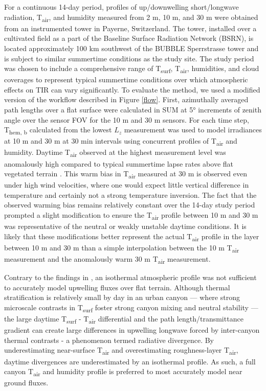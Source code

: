 \begin{bibunit}
For a continuous 14-day period, profiles of up/downwelling short/longwave radiation, T\textsubscript{air}, and humidity measured from 2 \si{m}, 10 \si{m}, and 30 \si{m} were obtained from an instrumented tower in Payerne, Switzerland. The tower, installed over a cultivated field as a part of the Baseline Surface Radiation Network (BSRN), is located approximately 100 \si{\kilo\meter} southwest of the BUBBLE Sperrstrasse tower and is subject to similar summertime conditions as the study site. The study period was chosen to include a comprehensive range of T\textsubscript{surf}, T\textsubscript{air}, humidities, and cloud coverages to represent typical summertime conditions over which atmospheric effects on TIR can vary significantly. To evaluate the method, we used a modified version of the workflow described in Figure \ref{flow}. First, azimuthally averaged path lengths over a flat surface were calculated in SUM at 5\si{\degree} increments of zenith angle over the sensor FOV for the 10 \si{\meter} and 30 \si{\meter} sensors. For each time step, T\textsubscript{hem, b} calculated from the lowest $L_z$ measurement was used to model irradiances at 10 \si{m} and 30 \si{m} at 30 \si{\minute} intervals using concurrent profiles of T\textsubscript{air} and humidity. Daytime T\textsubscript{air} observed at the highest measurement level was anomalously high compared to typical summertime lapse rates above flat vegetated terrain \citep{Oke1987}. This warm bias in T\textsubscript{air} measured at 30 \si{\meter} is observed even under high wind velocities, where one would expect little vertical difference in temperature and certainly not a strong temperature inversion. The fact that the observed warming bias remains relatively constant over the 14-day study period prompted a slight modification to ensure the T\textsubscript{air} profile between 10 \si{\meter} and 30 \si{\meter} was representative of the neutral or weakly unstable daytime conditions. It is likely that these modifications better represent the actual T\textsubscript{air} profile in the layer between 10 \si{\meter} and 30 \si{\meter} than a simple interpolation between the 10 \si{\meter} T\textsubscript{air} measurement and the anomalously warm 30 \si{\meter} T\textsubscript{air} measurement. 

Contrary to the findings in \citet{Kotani2009a}, an isothermal atmospheric profile was not sufficient to accurately model upwelling fluxes over flat terrain. Although thermal stratification is relatively small by day in an urban canyon \citep{Nakamura1988} --- where strong microscale contrasts in T\textsubscript{surf} foster strong canyon mixing and neutral stability --- the large daytime T\textsubscript{surf} - T\textsubscript{air} differential and the path length/transmittance gradient can create large differences in upwelling longwave forced by inter-canyon thermal contrasts - a phenomenon termed radiative divergence. By underestimating near-surface T\textsubscript{air} and overestimating roughness-layer T\textsubscript{air}, daytime divergences are underestimated by an isothermal profile. As such, a full canyon T\textsubscript{air} and humidity profile is preferred to most accurately model near ground fluxes.


\end{bibunit}
